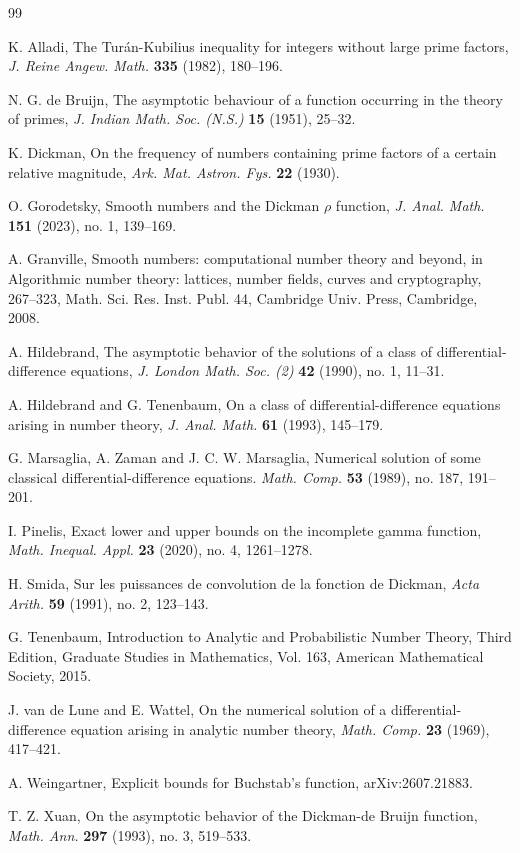 \documentclass[11pt]{amsart}
\begin{document}
\begin{thebibliography}{99}


K. Alladi, 
The Tur\'an-Kubilius inequality for integers without large prime factors,
\textit{J. Reine Angew. Math.} \textbf{335} (1982), 180--196.


N. G. de Bruijn,
The asymptotic behaviour of a function occurring in the theory of primes,
\textit{J. Indian Math. Soc. (N.S.)} \textbf{15} (1951), 25--32.

K. Dickman, 
On the frequency of numbers containing prime factors of a certain relative magnitude, 
\textit{Ark. Mat. Astron. Fys.} \textbf{22} (1930).

O. Gorodetsky,
Smooth numbers and the Dickman $\rho$ function,
\textit{J. Anal. Math.} \textbf{151} (2023), no. 1, 139--169.

A. Granville, 
Smooth numbers: computational number theory and beyond, in Algorithmic number theory: lattices, number fields, curves and cryptography, 267--323, Math. Sci. Res. Inst. Publ. 44, Cambridge Univ. Press, Cambridge, 2008.

A. Hildebrand, 
The asymptotic behavior of the solutions of a class of differential-difference equations,
\textit{J. London Math. Soc. (2)} \textbf{42} (1990), no. 1, 11--31.

A. Hildebrand and G. Tenenbaum,
On a class of differential-difference equations arising in number theory,
\textit{J. Anal. Math.} \textbf{61} (1993), 145--179.

G. Marsaglia, A. Zaman and J. C. W. Marsaglia, 
Numerical solution of some classical differential-difference equations.
\textit{Math. Comp.} \textbf{53} (1989), no. 187, 191--201.

I. Pinelis,
Exact lower and upper bounds on the incomplete gamma function,
\textit{Math. Inequal. Appl.} \textbf{23} (2020), no. 4, 1261--1278.

H. Smida,
Sur les puissances de convolution de la fonction de Dickman,
\textit{Acta Arith.} \textbf{59} (1991), no. 2, 123--143.

G. Tenenbaum, Introduction to Analytic and Probabilistic Number Theory, Third Edition, Graduate Studies in Mathematics, Vol. 163, American Mathematical Society, 2015.

 J. van de Lune and E. Wattel, 
On the numerical solution of a differential-difference equation arising in analytic number theory,
\textit{Math. Comp.} \textbf{23} (1969), 417--421.

A. Weingartner,
Explicit bounds for Buchstab's function, arXiv:2607.21883.

T. Z. Xuan,
On the asymptotic behavior of the Dickman-de Bruijn function,
\textit{Math. Ann.} \textbf{297} (1993), no. 3, 519--533.

\end{thebibliography}
\end{document}
